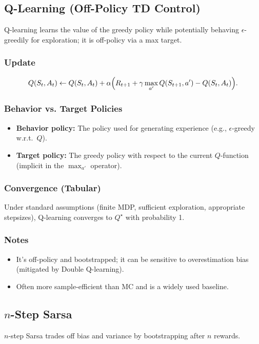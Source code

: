 \documentclass[12pt]{article}
\begin{document}
\subsection{Q-Learning (Off-Policy TD Control)}
Q-learning learns the value of the greedy policy while potentially behaving $\epsilon$-greedily for exploration; it is off-policy via a max target.

\subsubsection*{Update}
$$
Q(S_t, A_t) \leftarrow Q(S_t, A_t) + \alpha \Bigl(R_{t+1} + \gamma \max_{a'} Q(S_{t+1}, a') - Q(S_t, A_t)\Bigr).
$$

\subsubsection*{Behavior vs. Target Policies}
\begin{itemize}
    \item \textbf{Behavior policy:} The policy used for generating experience (e.g., $\epsilon$-greedy w.r.t.\ $Q$).
    \item \textbf{Target policy:} The greedy policy with respect to the current $Q$-function (implicit in the $\max_{a'}$ operator).
\end{itemize}

\subsubsection*{Convergence (Tabular)}
Under standard assumptions (finite MDP, sufficient exploration, appropriate stepsizes), Q-learning converges to $Q^\star$ with probability 1.

\subsubsection*{Notes}
\begin{itemize}
    \item It's off-policy and bootstrapped; it can be sensitive to overestimation bias (mitigated by Double Q-learning).
    \item Often more sample-efficient than MC and is a widely used baseline.
\end{itemize}

\subsection{$n$-Step Sarsa}
$n$-step Sarsa trades off bias and variance by bootstrapping after $n$ rewards.
\end{document}

